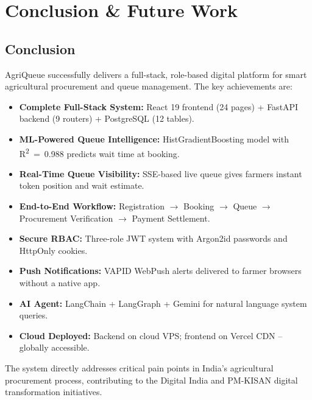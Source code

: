 \chapter{Conclusion \& Future Work}

\section{Conclusion}

AgriQueue successfully delivers a full-stack, role-based digital platform for smart agricultural procurement and queue management. The key achievements are:

\begin{itemize}
  \item \textbf{Complete Full-Stack System:} React 19 frontend (24 pages) + FastAPI backend (9 routers) + PostgreSQL (12 tables).
  \item \textbf{ML-Powered Queue Intelligence:} HistGradientBoosting model with R\textsuperscript{2}~=~0.988 predicts wait time at booking.
  \item \textbf{Real-Time Queue Visibility:} SSE-based live queue gives farmers instant token position and wait estimate.
  \item \textbf{End-to-End Workflow:} Registration $\to$ Booking $\to$ Queue $\to$ Procurement Verification $\to$ Payment Settlement.
  \item \textbf{Secure RBAC:} Three-role JWT system with Argon2id passwords and HttpOnly cookies.
  \item \textbf{Push Notifications:} VAPID WebPush alerts delivered to farmer browsers without a native app.
  \item \textbf{AI Agent:} LangChain + LangGraph + Gemini for natural language system queries.
  \item \textbf{Cloud Deployed:} Backend on cloud VPS; frontend on Vercel CDN -- globally accessible.
\end{itemize}

The system directly addresses critical pain points in India's agricultural procurement process, contributing to the Digital India and PM-KISAN digital transformation initiatives.

